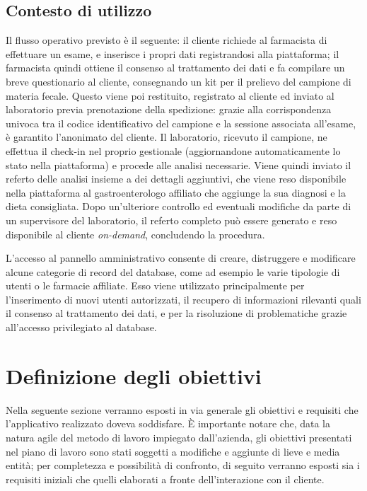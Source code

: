 \subsection{Contesto di utilizzo}
Il flusso operativo previsto è il seguente: il cliente richiede al farmacista di effettuare un esame, e inserisce i propri dati registrandosi alla piattaforma; il farmacista quindi ottiene il consenso al trattamento dei dati e fa compilare un breve questionario al cliente, consegnando un kit per il prelievo del campione di materia fecale. Questo viene poi restituito, registrato al cliente ed inviato al laboratorio previa prenotazione della spedizione: grazie alla corrispondenza univoca tra il codice identificativo del campione e la sessione associata all'esame, è garantito l'anonimato del cliente. Il laboratorio, ricevuto il campione, ne effettua il check-in nel proprio gestionale (aggiornandone automaticamente lo stato nella piattaforma) e procede alle analisi necessarie. Viene quindi inviato il referto delle analisi insieme a dei dettagli aggiuntivi, che viene reso disponibile nella piattaforma al gastroenterologo affiliato che aggiunge la sua diagnosi e la dieta consigliata. Dopo un'ulteriore controllo ed eventuali modifiche da parte di un supervisore del laboratorio, il referto completo può essere generato e reso disponibile al cliente \textit{on-demand}, concludendo la procedura.

L'accesso al pannello amministrativo consente di creare, distruggere e modificare alcune categorie di record del database, come ad esempio le varie tipologie di utenti o le farmacie affiliate. Esso viene utilizzato principalmente per l'inserimento di nuovi utenti autorizzati, il recupero di informazioni rilevanti quali il consenso al trattamento dei dati, e per la risoluzione di problematiche grazie all'accesso privilegiato al database.

\section{Definizione degli obiettivi}
Nella seguente sezione verranno esposti in via generale gli obiettivi e requisiti che l'applicativo realizzato doveva soddisfare. È importante notare che, data la natura agile del metodo di lavoro impiegato dall'azienda, gli obiettivi presentati nel piano di lavoro sono stati soggetti a modifiche e aggiunte di lieve e media entità; per completezza e possibilità di confronto, di seguito verranno esposti sia i requisiti iniziali che quelli elaborati a fronte dell'interazione con il cliente.
